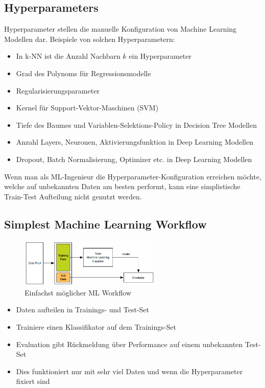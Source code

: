 \documentclass[a4paper]{article}
\begin{document}
		\newpage
		
		\subsection{Hyperparameters}
		
		Hyperparameter stellen die manuelle Konfiguration von Machine Learning Modellen dar.
		Beispiele von solchen Hyperparametern:
		
		\begin{itemize}
			\item In k-NN ist die Anzahl Nachbarn $k$ ein Hyperparameter
			\item Grad des Polynoms für Regressionsmodelle
			\item Regularisierungsparameter
			\item Kernel für Support-Vektor-Maschinen (SVM)
			\item Tiefe des Baumes und Variablen-Selektions-Policy in Decision Tree Modellen
			\item Anzahl Layers, Neuronen, Aktivierungsfunktion in Deep Learning Modellen
			\item Dropout, Batch Normalisierung, Optimizer etc. in Deep Learning Modellen
		\end{itemize}
	\noindent
		Wenn man als ML-Ingenieur die Hyperparameter-Konfiguration erreichen möchte, welche auf unbekannten Daten am besten performt, kann eine simplistische Train-Test Aufteilung nicht genutzt werden.
		
		\subsection{Simplest Machine Learning Workflow}
		
		\begin{figure}[htb!]
			\centering
			\includegraphics[width=0.6\textwidth]{img/04_supervised_ml/simple_ml.png}
			\caption{Einfachst möglicher ML Workflow}
			\label{fig:04_superv_ml_simple_ml}
		\end{figure}
		
		\begin{itemize}
			\item Daten aufteilen in Trainings- und Test-Set
			\item Trainiere einen Klassifikator auf dem Trainings-Set
			\item Evaluation gibt Rückmeldung über Performance auf einem unbekannten Test-Set
			\item Dies funktioniert nur mit sehr viel Daten und wenn die Hyperparameter fixiert sind
		\end{itemize}
	
\end{document}
